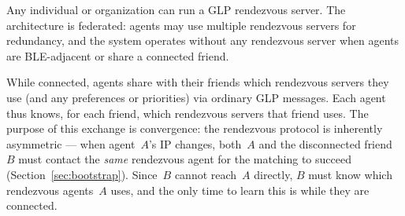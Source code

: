 Any individual or organization can run a GLP rendezvous server.  The architecture is federated: agents may use multiple rendezvous servers for redundancy, and the system operates without any rendezvous server when agents are BLE-adjacent or share a connected friend.

While connected, agents share with their friends which rendezvous servers they use (and any preferences or priorities) via ordinary GLP messages.  Each agent thus knows, for each friend, which rendezvous servers that friend uses.  The purpose of this exchange is convergence: the rendezvous protocol is inherently asymmetric --- when agent~$A$'s IP changes, both~$A$ and the disconnected friend~$B$ must contact the \emph{same} rendezvous agent for the matching to succeed (Section~\ref{sec:bootstrap}).  Since~$B$ cannot reach~$A$ directly, $B$ must know which rendezvous agents~$A$ uses, and the only time to learn this is while they are connected.



